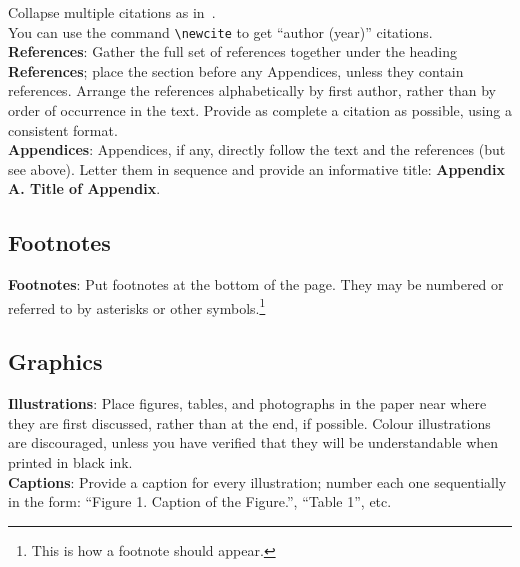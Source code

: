 \documentclass[11pt]{article}
\begin{document}
Collapse multiple citations as in~\cite{zen2,platform12}. 
\\

You can use the command \verb|\newcite| to get ``author (year)'' citations.\\

\textbf{References}: Gather the full set of references together under
the heading {\bf References}; place the section before any Appendices,
unless they contain references. Arrange the references alphabetically
by first author, rather than by order of occurrence in the text.
Provide as complete a citation as possible, using a consistent format.\\


{\bf Appendices}: Appendices, if any, directly follow the text and the
references (but see above).  Letter them in sequence and provide an
informative title: {\bf Appendix A. Title of Appendix}.

\subsection{Footnotes}

{\bf Footnotes}: Put footnotes at the bottom of the page.
They may be numbered or referred to by asterisks or other
symbols.\footnote{This is how a footnote should appear.} 

\subsection{Graphics}

{\bf Illustrations}: Place figures, tables, and photographs in the
paper near where they are first discussed, rather than at the end, if
possible. 
Colour illustrations are discouraged, unless you have verified that  
they will be understandable when printed in black ink.\\

{\bf Captions}: Provide a caption for every illustration; number each one
sequentially in the form:  ``Figure 1. Caption of the Figure.'',  ``Table 1'', etc.\\

\end{document}
